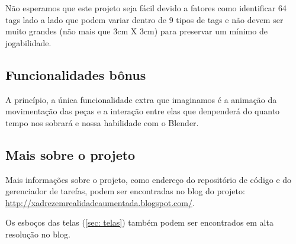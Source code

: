 \documentclass[a4paper,12pt]{book}
\begin{document}
N\~ao esperamos que este projeto seja f\'acil devido a fatores como identificar
64 tags lado a lado que podem variar dentro de 9 tipos de tags e n\~ao devem ser
muito grandes (n\~ao mais que 3cm X 3cm) para preservar um m\'inimo de
jogabilidade.

\subsection{Funcionalidades b\^onus}
\label{subsec: funcionalidaesbinus}

A princ\'ipio, a \'unica funcionalidade extra que imaginamos \'e a anima\c c\~ao
da movimenta\c c\~ao das pe\c cas e a intera\c c\~ao entre elas que denpender\'a
do quanto tempo nos sobrar\'a e nossa habilidade com o Blender.

\subsection{Mais sobre o projeto}
\label{subsec; maissobreoprojeto}

Mais informa\c c\~oes sobre o projeto, como endere\c co do reposit\'orio de
c\'odigo e do gerenciador de tarefas, podem ser encontradas no blog do projeto:
\url{http://xadrezemrealidadeaumentada.blogspot.com/}.

Os esbo\c cos das telas (\ref{sec: telas}) tamb\'em podem ser encontrados em
alta resolu\c c\~ao no blog.
\end{document}
